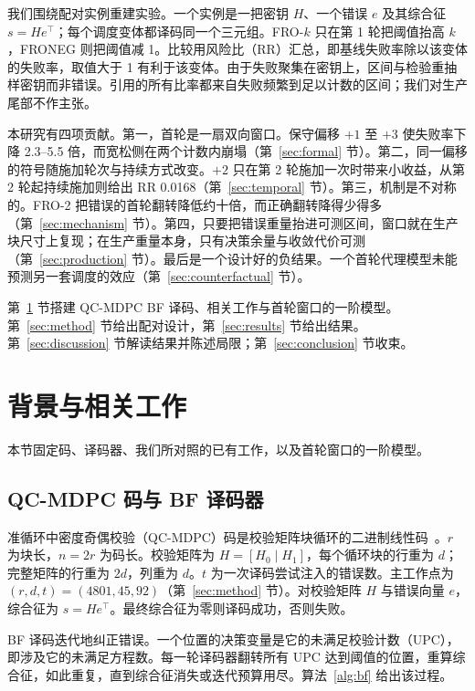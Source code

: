 \documentclass[UTF8,a4paper,10pt,onecolumn]{ctexart}
\begin{document}
我们围绕配对实例重建实验。一个实例是一把密钥 $H$、一个错误 $e$ 及其综合征 $s=He^{\top}$；每个调度变体都译码同一个三元组。FRO-$k$ 只在第 1 轮把阈值抬高 $k$，FRONEG 则把阈值减 1。比较用风险比（RR）汇总，即基线失败率除以该变体的失败率，取值大于 1 有利于该变体。由于失败聚集在密钥上，区间与检验重抽样密钥而非错误。引用的所有比率都来自失败频繁到足以计数的区间；我们对生产尾部不作主张。

本研究有四项贡献。第一，首轮是一扇双向窗口。保守偏移 $+1$ 至 $+3$ 使失败率下降 2.3--5.5 倍，而宽松侧在两个计数内崩塌（第~\ref{sec:formal} 节）。第二，同一偏移的符号随施加轮次与持续方式改变。$+2$ 只在第 2 轮施加一次时带来小收益，从第 2 轮起持续施加则给出 RR 0.0168（第~\ref{sec:temporal} 节）。第三，机制是不对称的。FRO-2 把错误的首轮翻转降低约十倍，而正确翻转降得少得多（第~\ref{sec:mechanism} 节）。第四，只要把错误重量抬进可测区间，窗口就在生产块尺寸上复现；在生产重量本身，只有决策余量与收敛代价可测（第~\ref{sec:production} 节）。最后是一个设计好的负结果。一个首轮代理模型未能预测另一套调度的效应（第~\ref{sec:counterfactual} 节）。

第~\ref{sec:background} 节搭建 QC-MDPC BF 译码、相关工作与首轮窗口的一阶模型。第~\ref{sec:method} 节给出配对设计，第~\ref{sec:results} 节给出结果。第~\ref{sec:discussion} 节解读结果并陈述局限；第~\ref{sec:conclusion} 节收束。
\section{背景与相关工作}\label{sec:background}

本节固定码、译码器、我们所对照的已有工作，以及首轮窗口的一阶模型。

\subsection{QC-MDPC 码与 BF 译码器}

准循环中密度奇偶校验（QC-MDPC）码是校验矩阵块循环的二进制线性码~\cite{misoczki2013mdpc}。$r$ 为块长，$n=2r$ 为码长。校验矩阵为 $H=[H_0\mid H_1]$，每个循环块的行重为 $d$；完整矩阵的行重为 $2d$，列重为 $d$。$t$ 为一次译码尝试注入的错误数。主工作点为 $(r,d,t)=(4801,45,92)$（第~\ref{sec:method} 节）。对校验矩阵 $H$ 与错误向量 $e$，综合征为 $s=He^{\top}$。最终综合征为零则译码成功，否则失败。

BF 译码迭代地纠正错误。一个位置的决策变量是它的未满足校验计数（UPC），即涉及它的未满足方程数。每一轮译码器翻转所有 UPC 达到阈值的位置，重算综合征，如此重复，直到综合征消失或迭代预算用尽。算法~\ref{alg:bf} 给出该过程。
\end{document}
